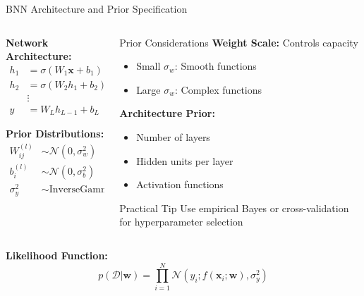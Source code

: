 \documentclass[aspectratio=169,11pt]{beamer}
\newcommand{\Normal}{\mathcal{N}}
\newcommand{\bw}{\mathbf{w}}
\newcommand{\bx}{\mathbf{x}}
\begin{document}
\begin{frame}{BNN Architecture and Prior Specification}
\begin{columns}
\begin{column}{0.6\textwidth}
\textbf{Network Architecture:}
\begin{align}
h_1 &= \sigma(W_1 \bx + b_1)\\
h_2 &= \sigma(W_2 h_1 + b_2)\\
&\vdots\\
y &= W_L h_{L-1} + b_L
\end{align}

\textbf{Prior Distributions:}
\begin{align}
W_{ij}^{(l)} &\sim \Normal(0, \sigma_w^2)\\
b_i^{(l)} &\sim \Normal(0, \sigma_b^2)\\
\sigma_y^2 &\sim \text{InverseGamma}(\alpha, \beta)
\end{align}
\end{column}
\begin{column}{0.4\textwidth}
\begin{block}{Prior Considerations}
\textbf{Weight Scale:} Controls capacity
\begin{itemize}
\item Small $\sigma_w$: Smooth functions
\item Large $\sigma_w$: Complex functions
\end{itemize}

\textbf{Architecture Prior:}
\begin{itemize}
\item Number of layers
\item Hidden units per layer
\item Activation functions
\end{itemize}
\end{block}

\begin{alertblock}{Practical Tip}
Use empirical Bayes or cross-validation for hyperparameter selection
\end{alertblock}
\end{column}
\end{columns}

\vspace{0.3cm}
\textbf{Likelihood Function:}
\[p(\mathcal{D}|\bw) = \prod_{i=1}^N \Normal(y_i; f(\bx_i; \bw), \sigma_y^2)\]
\end{frame}
\end{document}
